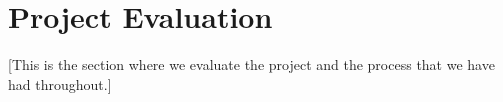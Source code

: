 \section{Project Evaluation}\label{Project Evaluation}
    [This is the section where we evaluate the project and the process that we have had throughout.]
